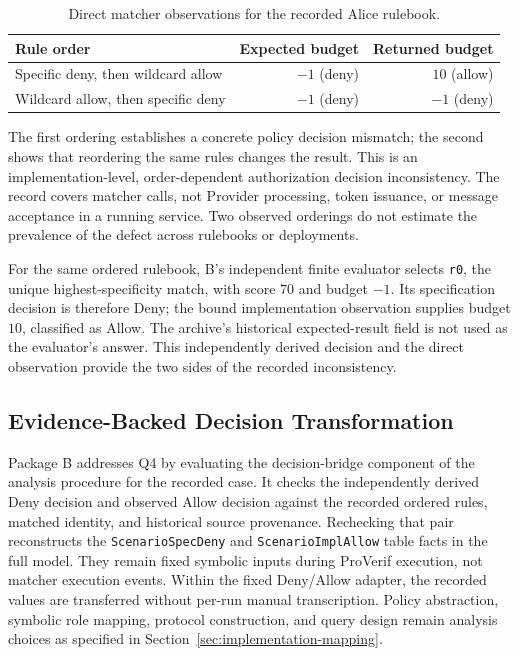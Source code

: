 \begin{table}[htbp]
\centering
\small
\begin{tabular}{lrr}
\hline
Rule order & Expected budget & Returned budget \\
\hline
Specific deny, then wildcard allow & $-1$ (deny) & $10$ (allow) \\
Wildcard allow, then specific deny & $-1$ (deny) & $-1$ (deny) \\
\hline
\end{tabular}
\caption{Direct matcher observations for the recorded Alice rulebook.}
\label{tab:matcher-evaluation}
\end{table}

The first ordering establishes a concrete policy decision mismatch; the
second shows that reordering the same rules changes the result. This is
an implementation-level, order-dependent authorization decision inconsistency. The record
covers matcher calls, not Provider processing, token issuance, or message
acceptance in a running service. Two observed orderings do not estimate
the prevalence of the defect across rulebooks or deployments.

For the same ordered rulebook, B's independent finite evaluator selects
\texttt{r0}, the unique highest-specificity match, with score $70$ and
budget $-1$. Its specification decision is therefore Deny; the bound
implementation observation supplies budget $10$, classified as Allow.
The archive's historical expected-result field is not used as the evaluator's
answer. This independently derived decision and the direct observation
provide the two sides of the recorded inconsistency.

\subsection{Evidence-Backed Decision Transformation}

Package B addresses Q4 by evaluating the decision-bridge component of the
analysis procedure for the recorded case. It checks the independently derived
Deny decision and observed Allow decision against the recorded ordered rules, matched identity, and
historical source provenance. Rechecking that pair reconstructs the
\texttt{ScenarioSpecDeny} and \texttt{ScenarioImplAllow} table facts in the
full model. They remain fixed symbolic inputs during ProVerif execution,
not matcher execution events. Within the fixed Deny/Allow adapter, the
recorded values are transferred without per-run manual transcription.
Policy abstraction, symbolic role mapping, protocol construction, and query
design remain analysis choices as specified in Section~\ref{sec:implementation-mapping}.

